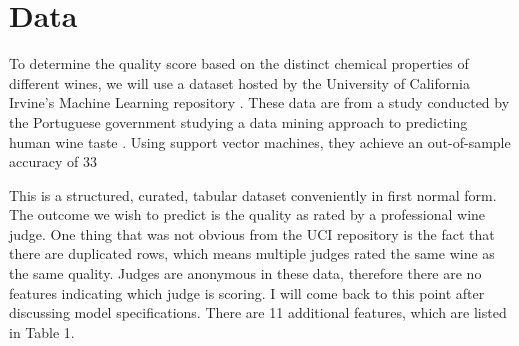 \documentclass[16pt,twocolumn,letterpaper,titlepage]{article}
\begin{document}
\section{Data}

To determine the quality score based on the distinct chemical properties of different wines, we will use a dataset hosted by the University of California Irvine's Machine Learning repository \cite{Lichman:2013}. These data are from	a study conducted by the Portuguese government studying a data mining approach to predicting human wine taste \cite{Cortez}. Using support vector machines, they achieve an out-of-sample accuracy of 33%

This is a structured, curated, tabular dataset conveniently in first normal form. The outcome we wish to predict is the quality as rated by a professional wine judge. One thing that was not obvious from the UCI repository is the fact that there are duplicated rows, which means multiple judges rated the same wine as the same quality. Judges are anonymous in these data, therefore there are no features indicating which judge is scoring. I will come back to this point after discussing model specifications. There are 11 additional features, which are listed in Table 1.  
\end{document}
